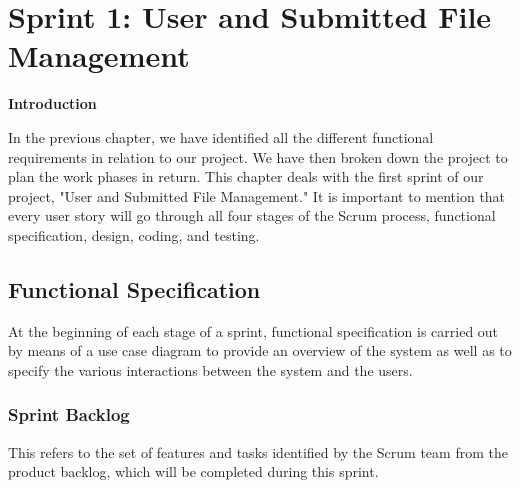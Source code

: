 \chapter{Sprint 1:  User and Submitted File Management}
\newpage
\begin{center}
    \centering
    \LARGE\textbf{Introduction} 
     \vspace{1cm} \\
   \raggedright
\end{center}
In the previous chapter, we have identified all the different functional requirements in relation to our project. We have then broken down the project to plan the work phases in return. This chapter deals with the first sprint of our project, "User and Submitted File Management."
It is important to mention that every user story will go through all four stages of the Scrum process, functional specification, design, coding, and testing.
\section{Functional Specification}
At the beginning of each stage of a sprint, functional specification is carried out by means of a use case diagram to provide an overview of the system as well as to specify the various interactions between the system and the users.
\subsection{Sprint Backlog}
This refers to the set of features and tasks identified by the Scrum team from the product backlog, which will be completed during this sprint.

\renewcommand{\arraystretch}{1.2}
\setlength{\tabcolsep}{6pt}

